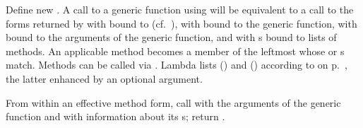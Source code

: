 \begin{LIST}{1cm}
  {
     Define new 
    . A call to a generic function using
     will be equivalent to a call to the forms returned by
     with  bound to
     (cf.\ ), with  bound to
    the generic function, with 
    bound to the arguments of the generic function, and with
    s bound to lists of methods. An applicable method becomes
    a member of the leftmost  whose  or
    s match. Methods can be called via
    . Lambda lists () and
    () according to
     on p.\ \pageref{section:Functions}, the latter
    enhanced by an optional  argument.
  }

  {
    From within an effective method form, call  with the
    arguments of the generic function and
    with information about its s; return . 
  }

\end{LIST}



